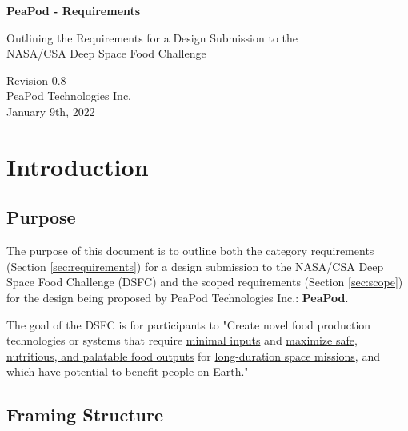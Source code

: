 \documentclass{report}
\begin{document}
\begin{titlepage}
    \begin{center}
        \vspace*{1.2cm}

        \textbf{\large{PeaPod - Requirements}}

        \vspace{0.5cm}

        Outlining the Requirements for a Design Submission to the \\NASA/CSA Deep Space Food Challenge

        \vfill
        
        \vspace{.75cm}

        Revision 0.8\\
        PeaPod Technologies Inc.\\
        January 9th, 2022

    \end{center}
\end{titlepage}

\thispagestyle{plain}

\tableofcontents
\newpage

\section{Introduction}
\label{sec:intro}

\subsection{Purpose}
\label{sec:purpose}

The purpose of this document is to outline both the category requirements (Section \ref{sec:requirements}) for a design submission to the NASA/CSA Deep Space Food Challenge (DSFC) \cite{dsfc} and the scoped requirements (Section \ref{sec:scope}) for the design being proposed by PeaPod Technologies Inc.: \textbf{PeaPod}.

The goal of the DSFC is for participants to "Create novel food production technologies or systems that require \uline{minimal inputs} and \uline{maximize safe, nutritious, and palatable food outputs} for \uline{long-duration space missions}, and which have potential to benefit people on Earth." \cite{applicantguide}

\subsection{Framing Structure}
\label{sec:structure}
\end{document}
